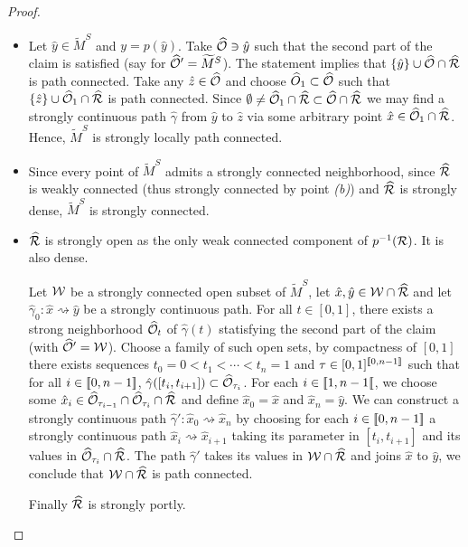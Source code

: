 \begin{proof}
\begin{itemize}
 \item Let $\hat y\in \widetilde M^S$ and $y=p(\hat y)$. Take $\widehat {\mathcal{O}}\ni \hat y$  such that the second part of the claim is satisfied (say for $\widehat{\mathcal{O}}'=\widetilde M^S$). The statement implies that $\{\hat y \}\cup \widehat {\mathcal{O}}\cap\widehat {\mathcal R} $ is path connected. Take any $\hat z\in \widehat {\mathcal{O}}$ and choose $\widehat O_1\subset \widehat {\mathcal{O}}$  such that $\{\hat z \}\cup \widehat {\mathcal{O}}_1\cap\widehat {\mathcal R} $ is path connected. 
 Since $\emptyset\neq\widehat {\mathcal{O}}_1\cap\widehat {\mathcal R}\subset \widehat {\mathcal{O}}\cap\widehat {\mathcal R}$ we may find a strongly continuous path $\hat \gamma$ from $\hat y$ to $\hat z$ via some arbitrary point $\hat x\in \widehat {\mathcal{O}}_1\cap\widehat {\mathcal R}$. Hence, $\widetilde M^S$ is  strongly locally path connected.
 
 \item Since every point of $\widetilde M^S$ admits a strongly connected  neighborhood, since $\widehat {\mathcal R}$ is weakly  connected (thus strongly connected by point {\it(b)}) and $\widehat{\mathcal R}$ is strongly dense, $\widetilde M^S$ is strongly connected.
 \item $\widehat {\mathcal R}$ is strongly open as the only weak connected component of $p^{-1}(\mathcal R)$. It is also dense. 
 
 Let  $\mathcal W$ be a strongly connected open subset of $\widetilde M^S$, let $\hat x,\hat y\in \mathcal W\cap\widehat {\mathcal R}$ and let $\hat \gamma_0:\hat x\rightsquigarrow \hat y$ be a strongly continuous path. For all $t\in [0,1]$, there exists a strong neighborhood $\widehat{\mathcal{O}}_t$ of $\hat\gamma(t)$ statisfying the second part of the claim (with $\widehat{\mathcal{O}}'=\mathcal W$). Choose a family of such open sets, by compactness of $[0,1]$ there exists  sequences $t_0=0<t_1<\cdots<t_n=1$ and $\tau \in [0,1]^{[\![ 0,n-1]\!]}$ such that for all $i\in [\![ 0,n-1]\!]$, $\hat \gamma([t_i,t_{i+1}])\subset \widehat{\mathcal{O}}_{\tau_i}$. For each $i\in [\![ 1,n-1[\![$, we  choose some $\hat x_i \in \widehat{\mathcal{O}}_{\tau_{i-1}}\cap \widehat{\mathcal{O}}_{\tau_i}\cap \widehat {\mathcal R}$ and define $\hat x_0=\hat x$ and $\hat x_n=\hat y$.  We can construct a strongly continuous path $\hat \gamma':\hat x_0\rightsquigarrow \hat x_n$ by choosing for each $i\in [\![ 0, n-1]\!] $ a strongly continuous  path $\hat x_i\rightsquigarrow \hat x_{i+1}$ taking its parameter in $[t_i,t_{i+1}]$ and its values in $\widehat{\mathcal{O}}_{\tau_i}\cap \widehat {\mathcal R}$.  The path $\hat \gamma'$  takes its values in $\mathcal W\cap \widehat {\mathcal R}$ and joins $\hat x$ to $\hat y$, we conclude that $\mathcal W\cap \widehat {\mathcal R}$ is path connected.
 
 Finally $\widehat {\mathcal R}$ is strongly portly.


\end{itemize}
\end{proof}
